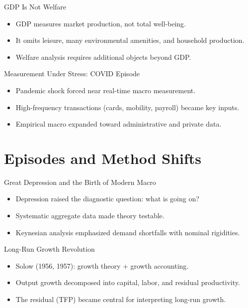 \documentclass[aspectratio=169,10pt]{beamer}
\newcommand{\apxbutton}[1]{\hfill\hyperlink{#1}{\beamerbutton{Appendix}}}
\begin{document}
\begin{frame}{GDP Is Not Welfare}
\begin{itemize}
  \item GDP measures market production, not total well-being.
  \item It omits leisure, many environmental amenities, and household production.
  \item Welfare analysis requires additional objects beyond GDP.
\end{itemize}
\end{frame}

\begin{frame}{Measurement Under Stress: COVID Episode}
\begin{itemize}
  \item Pandemic shock forced near real-time macro measurement.
  \item High-frequency transactions (cards, mobility, payroll) became key inputs.
  \item Empirical macro expanded toward administrative and private data.
\end{itemize}
\end{frame}

\section{Episodes and Method Shifts}

\begin{frame}{Great Depression and the Birth of Modern Macro}
\begin{itemize}
  \item Depression raised the diagnostic question: what is going on?
  \item Systematic aggregate data made theory testable.
  \item Keynesian analysis emphasized demand shortfalls with nominal rigidities.
\end{itemize}
\end{frame}

\begin{frame}{Long-Run Growth Revolution}
\hypertarget{main-growthacct}{}
\begin{itemize}
  \item Solow (1956, 1957): growth theory + growth accounting.
  \item Output growth decomposed into capital, labor, and residual productivity.
  \item The residual (TFP) became central for interpreting long-run growth.
\end{itemize}
\apxbutton{apx-growthacct}
\end{frame}
\end{document}
